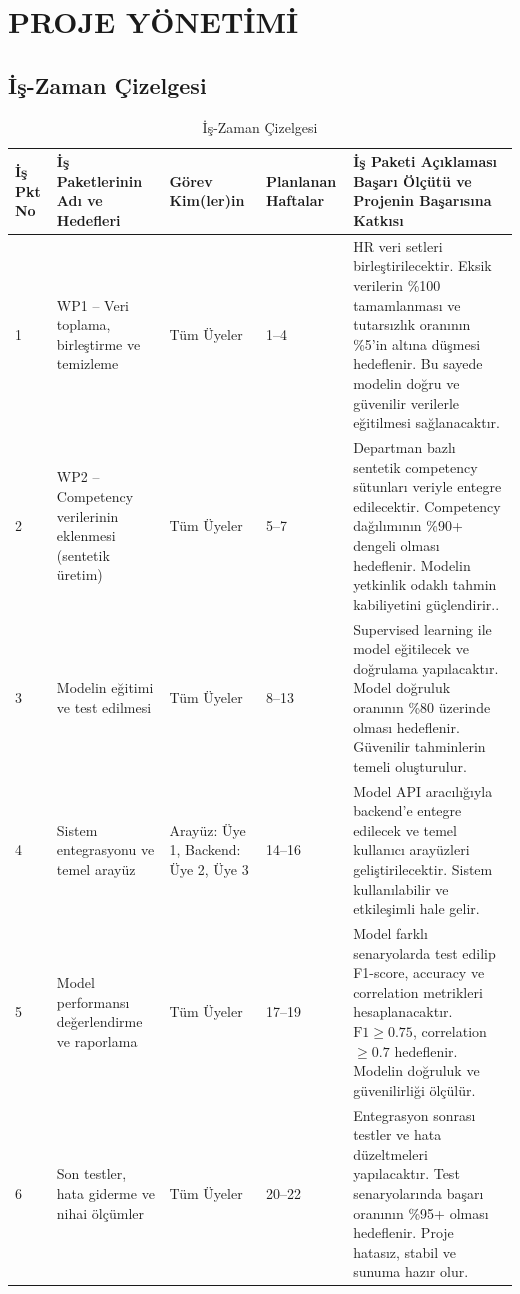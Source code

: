\documentclass[a4paper,12pt]{article}
\begin{document}
\newpage

\section*{PROJE YÖNETİMİ}
\subsection*{İş-Zaman Çizelgesi}
\begin{table}[h!]
\centering
\renewcommand{\arraystretch}{1.3}
\setlength{\tabcolsep}{6pt}
\begin{tabular}{|p{1cm}|p{3cm}|p{2cm}|p{2cm}|p{6cm}|}
\hline
\textbf{İş Pkt No} & \textbf{İş Paketlerinin Adı ve Hedefleri} & \textbf{Görev Kim(ler)in}& \textbf{Planlanan Haftalar} & \textbf{İş Paketi Açıklaması Başarı Ölçütü ve Projenin Başarısına Katkısı } \\
\hline
1 & WP1 – Veri toplama, birleştirme ve temizleme & Tüm Üyeler & 1–4 & HR veri setleri birleştirilecektir. Eksik verilerin \%100 tamamlanması ve tutarsızlık oranının \%5’in altına düşmesi hedeflenir. Bu sayede modelin doğru ve güvenilir verilerle eğitilmesi sağlanacaktır.\\
\hline
2 & WP2 – Competency verilerinin eklenmesi (sentetik üretim) & Tüm Üyeler & 5–7 & Departman bazlı sentetik competency sütunları veriyle entegre edilecektir. Competency dağılımının \%90+ dengeli olması hedeflenir. Modelin yetkinlik odaklı tahmin kabiliyetini güçlendirir..\\
\hline
3 & Modelin eğitimi ve test edilmesi & Tüm Üyeler & 8–13 & Supervised learning ile model eğitilecek ve doğrulama yapılacaktır. Model doğruluk oranının \%80 üzerinde olması hedeflenir. Güvenilir tahminlerin temeli oluşturulur.\\
\hline
4 & Sistem entegrasyonu ve temel arayüz & Arayüz: Üye 1, Backend: Üye 2, Üye 3 & 14–16 & Model API aracılığıyla backend’e entegre edilecek ve temel kullanıcı arayüzleri geliştirilecektir. Sistem kullanılabilir ve etkileşimli hale gelir.\\
\hline
5 & Model performansı değerlendirme ve raporlama & Tüm Üyeler & 17–19 & Model farklı senaryolarda test edilip F1-score, accuracy ve correlation metrikleri hesaplanacaktır. $\mathrm{F1} \ge 0.75$, correlation $\ge 0.7$ hedeflenir. Modelin doğruluk ve güvenilirliği ölçülür.\\
\hline
6 &  Son testler, hata giderme ve nihai ölçümler & Tüm Üyeler & 20–22 & Entegrasyon sonrası testler ve hata düzeltmeleri yapılacaktır. Test senaryolarında başarı oranının \%95+ olması hedeflenir. Proje hatasız, stabil ve sunuma hazır olur.\\
\hline
\end{tabular}
\caption{İş-Zaman Çizelgesi }
\end{table}
\end{document}
